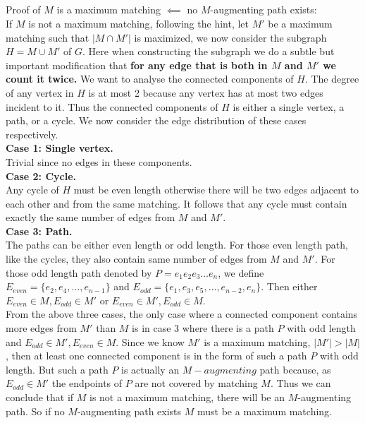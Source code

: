 \documentclass[12pt,letterpaper]{article}
\begin{document}
\subsection{}
Proof of $M$ is a maximum matching $\impliedby$ no $M$-augmenting path exists:\\
If $M$ is not a maximum matching, following the hint,
let $M'$ be a maximum matching such that $|M\cap M'|$ is maximized,
we now consider the subgraph $H=M\cup M'$ of $G$.
Here when constructing the subgraph we do a subtle but important modification that 
\textbf{for any edge that is both in $M$ and $M'$ we count it twice.}
We want to analyse the connected components of $H$.
The degree of any vertex in $H$ is at most 2 
because any vertex has at most two edges incident to it.
Thus the connected components of $H$ is either a single vertex,
a path, or a cycle.
We now consider the edge distribution of these cases respectively.\\
\textbf{Case 1: Single vertex.}\\
Trivial since no edges in these components.\\
\textbf{Case 2: Cycle.}\\
Any cycle of $H$ must be even length otherwise there will be 
two edges adjacent to each other and from the same matching.
It follows that any cycle must contain exactly the same number of edges from $M$ and $M'$.\\
\textbf{Case 3: Path.}\\
The paths can be either even length or odd length.
For those even length path, like the cycles,
they also contain same number of edges from $M$ and $M'$.
For those odd length path denoted by $P=e_1e_2e_3\dots e_n$,
we define $E_{even}=\{e_2,e_4,\dots,e_{n-1}\}$
and $E_{odd}=\{e_1,e_3,e_5,\dots,e_{n-2},e_{n}\}$. 
Then either $E_{even}\in M, E_{odd}\in M'$ or $E_{even}\in M', E_{odd}\in M$.\\
\newline
From the above three cases, the only case where a connected component
contains more edges from $M'$ than $M$ is in case 3 where 
there is a path $P$ with odd length and $E_{odd}\in M', E_{even}\in M$.
Since we know $M'$ is a maximum matching, $|M'|>|M|$,
then at least one connected component is in the form of such a path $P$ with 
odd length.
But such a path $P$ is actually an $M-augmenting$ path because,
as $E_{odd}\in M'$ the endpoints of $P$ are not covered by matching $M$.
Thus we can conclude that if $M$ is not a maximum matching, 
there will be an $M$-augmenting path.
So if no $M$-augmenting path exists $M$ must be a maximum matching.
\end{document}
